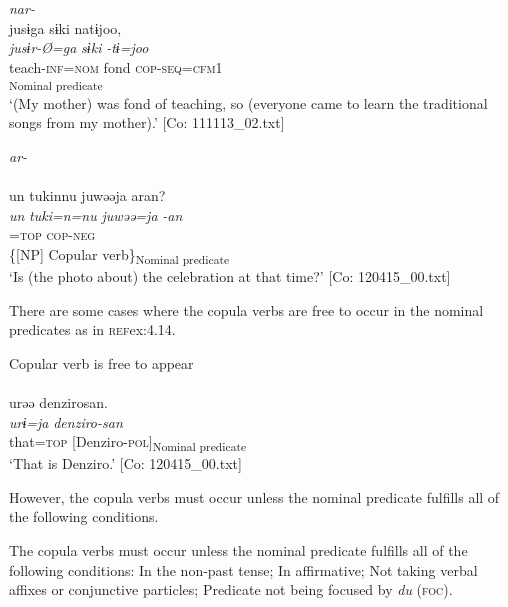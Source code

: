\ex  \textit{nar-}\\
\gllll   jusɨga  sɨki  natɨjoo,\\
      \textit{jusɨr-Ø=ga}  \textit{sɨki}  \textit{-tɨ=joo}\\
      teach-\textsc{inf}=\textsc{nom}  fond  \textsc{cop}-\textsc{seq}=\textsc{cfm}1\\
        [NP  Copular verb]\textsubscript{Nominal predicate}\\
      \glt       ‘(My mother) was fond of teaching, so (everyone came to learn the traditional songs from my mother).’ [Co: 111113\_02.txt]

\ex  \textit{ar-}\\\\
\gllll     un  tukinnu  juwəəja  aran?\\
      \textit{un}  \textit{tuki=n=nu}  \textit{juwəə=ja}  \textit{-an}\\
      [that  time=\textsc{dat}1=\textsc{gen}  celebration]=\textsc{top}  \textsc{cop}-\textsc{neg}\\
      \{[NP]  Copular verb\}\textsubscript{Nominal predicate}\\
      \glt       ‘Is (the photo about) the celebration at that time?’ [Co: 120415\_00.txt]
    \z
\z

There are some cases where the copula verbs are free to occur in the nominal predicates as in \textsc{ref}{ex:4.14}.

\ea  Copular verb is free to appear \label{ex:4.14}\\\\
\glll    urəə  denzirosan.\\
    \textit{urɨ=ja}  \textit{denziro-san}\\
    that=\textsc{top}  [Denziro-\textsc{pol}]\textsubscript{Nominal predicate}\\
    \glt     ‘That is Denziro.’ [Co: 120415\_00.txt]
\z

However, the copula verbs must occur unless the nominal predicate fulfills all of the following conditions.

\ea  The copula verbs must occur unless the nominal predicate fulfills all of the following conditions: \label{ex:4.15}
  \ea  In the non-past tense;
  \ex  In affirmative;
  \ex  Not taking verbal affixes or conjunctive particles;
  \ex  Predicate not being focused by \textit{du} (\textsc{foc}).
  \z
\z

